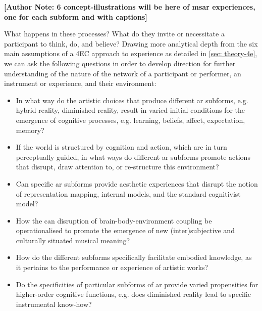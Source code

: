 \textbf{[Author Note: 6 concept-illustrations will be here of \gls{msar} experiences, one for each subform and with captions]}

What happens in these processes?  What do they invite or necessitate a participant to think, do, and believe? Drawing more analytical depth from the six main assumptions of a 4EC approach to experience as detailed in \autoref{sec: theory-4e}, we can ask the following questions in order to develop direction for further understanding of the nature of the network of a participant or performer, an instrument or experience, and their environment:
	\begin{itemize}
	    \item In what way do the artistic choices that produce different \gls{ar} subforms, e.g. hybrid reality, diminished reality, result in varied initial conditions for the emergence of cognitive processes, e.g. learning, beliefs, affect, expectation, memory?

	    \item If the world is structured by cognition and action, which are in turn perceptually guided, in what ways do different \gls{ar} subforms promote actions that disrupt, draw attention to, or re-structure this environment?

	    \item Can specific \gls{ar} subforms provide aesthetic experiences that disrupt the notion of representation mapping, internal models, and the standard cognitivist model?

	    \item How the can disruption of brain-body-environment coupling be operationalised to promote the emergence of new (inter)subjective and culturally situated musical meaning?

	    \item How do the different subforms specifically facilitate embodied knowledge, as it pertains to the performance or experience of artistic works?

	    \item Do the specificities of particular subforms of \gls{ar} provide varied propensities for higher-order cognitive functions, e.g. does diminished reality lead to specific instrumental know-how?
	\end{itemize}

